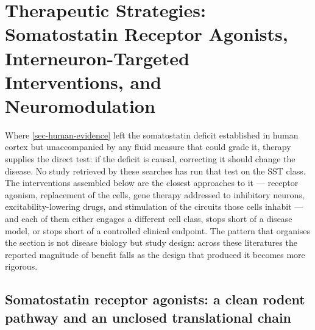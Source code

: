 \documentclass[11pt]{article}
\begin{document}
\section{Therapeutic Strategies: Somatostatin Receptor Agonists, Interneuron-Targeted Interventions, and Neuromodulation}
\label{sec-therapeutics}

Where \ref{sec-human-evidence} left the somatostatin deficit established in human cortex but unaccompanied by any fluid measure that could grade it, therapy supplies the direct test: if the deficit is causal, correcting it should change the disease. No study retrieved by these searches has run that test on the SST class. The interventions assembled below are the closest approaches to it --- receptor agonism, replacement of the cells, gene therapy addressed to inhibitory neurons, excitability-lowering drugs, and stimulation of the circuits those cells inhabit --- and each of them either engages a different cell class, stops short of a disease model, or stops short of a controlled clinical endpoint. The pattern that organises the section is not disease biology but study design: across these literatures the reported magnitude of benefit falls as the design that produced it becomes more rigorous.

\subsection{Somatostatin receptor agonists: a clean rodent pathway and an unclosed translational chain}
\label{sec-10-sstr-agonists}
\end{document}
